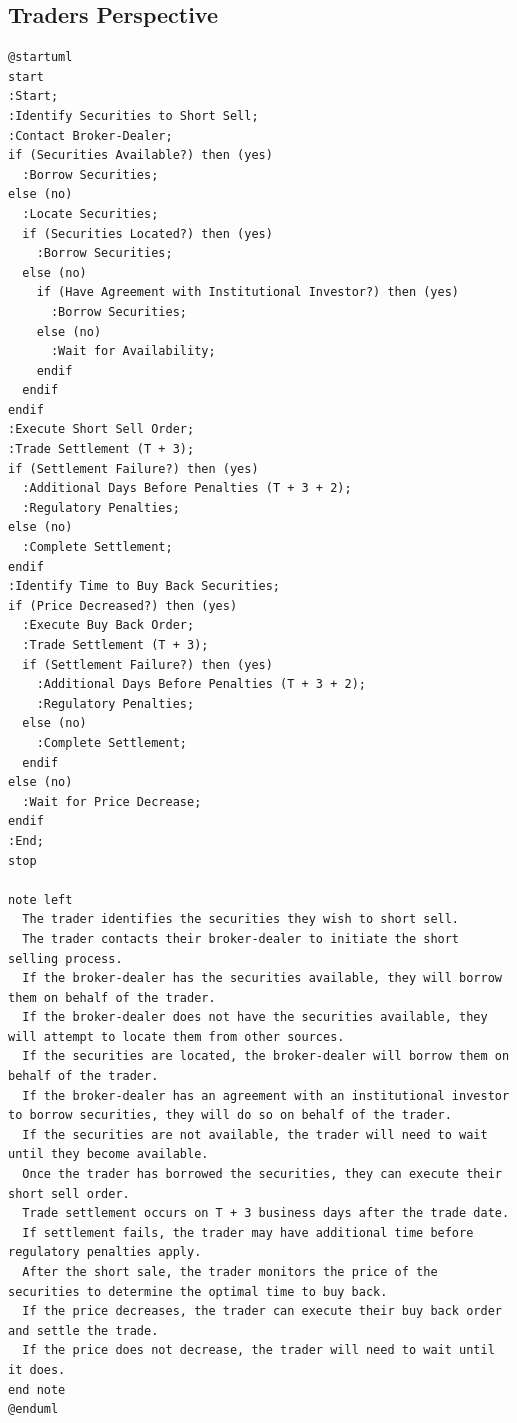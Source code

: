 \documentclass[11pt]{article}
\begin{document}
\subsection{Traders Perspective}
\label{sec:orga8f0f0d}
\begin{verbatim}
@startuml
start
:Start;
:Identify Securities to Short Sell;
:Contact Broker-Dealer;
if (Securities Available?) then (yes)
  :Borrow Securities;
else (no)
  :Locate Securities;
  if (Securities Located?) then (yes)
    :Borrow Securities;
  else (no)
    if (Have Agreement with Institutional Investor?) then (yes)
      :Borrow Securities;
    else (no)
      :Wait for Availability;
    endif
  endif
endif
:Execute Short Sell Order;
:Trade Settlement (T + 3);
if (Settlement Failure?) then (yes)
  :Additional Days Before Penalties (T + 3 + 2);
  :Regulatory Penalties;
else (no)
  :Complete Settlement;
endif
:Identify Time to Buy Back Securities;
if (Price Decreased?) then (yes)
  :Execute Buy Back Order;
  :Trade Settlement (T + 3);
  if (Settlement Failure?) then (yes)
    :Additional Days Before Penalties (T + 3 + 2);
    :Regulatory Penalties;
  else (no)
    :Complete Settlement;
  endif
else (no)
  :Wait for Price Decrease;
endif
:End;
stop

note left
  The trader identifies the securities they wish to short sell.
  The trader contacts their broker-dealer to initiate the short selling process.
  If the broker-dealer has the securities available, they will borrow them on behalf of the trader.
  If the broker-dealer does not have the securities available, they will attempt to locate them from other sources.
  If the securities are located, the broker-dealer will borrow them on behalf of the trader.
  If the broker-dealer has an agreement with an institutional investor to borrow securities, they will do so on behalf of the trader.
  If the securities are not available, the trader will need to wait until they become available.
  Once the trader has borrowed the securities, they can execute their short sell order.
  Trade settlement occurs on T + 3 business days after the trade date.
  If settlement fails, the trader may have additional time before regulatory penalties apply.
  After the short sale, the trader monitors the price of the securities to determine the optimal time to buy back.
  If the price decreases, the trader can execute their buy back order and settle the trade.
  If the price does not decrease, the trader will need to wait until it does.
end note
@enduml
\end{verbatim}
\end{document}
